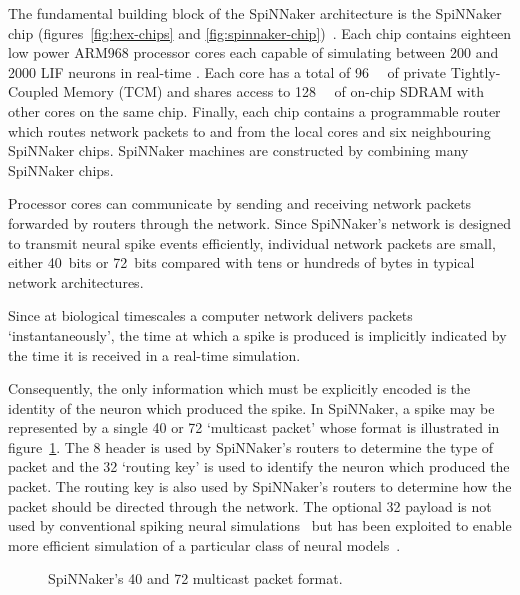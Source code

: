 		The fundamental building block of the SpiNNaker architecture is the
		SpiNNaker chip (figures~\ref{fig:hex-chips} and
		\ref{fig:spinnaker-chip})~\cite{furber13}. Each chip contains eighteen low
		power ARM968 processor cores each capable of simulating between \num{200}
		and \num{2000} LIF neurons in real-time \cite{mundy15}.  Each core has a
		total of \SI{96}{\kilo\byte} of private Tightly-Coupled Memory (TCM) and
		shares access to \SI{128}{\mega\byte} of on-chip SDRAM with other cores on
		the same chip. Finally, each chip contains a programmable router which
		routes network packets to and from the local cores and six neighbouring
		SpiNNaker chips. SpiNNaker machines are constructed by combining many
		SpiNNaker chips.
		
		Processor cores can communicate by sending and receiving network packets
		forwarded by routers through the network. Since SpiNNaker's network is
		designed to transmit neural spike events efficiently, individual network
		packets are small, either 40~bits or 72~bits compared with tens or hundreds
		of bytes in typical network architectures.
		
		Since at biological timescales a computer network delivers packets
		`instantaneously', the time at which a spike is produced is implicitly
		indicated by the time it is received in a real-time simulation.
		
		Consequently, the only information which must be explicitly encoded is the
		identity of the neuron which produced the spike. In SpiNNaker, a spike may
		be represented by a single 40 or \SI{72}{\bit} `multicast packet' whose
		format is illustrated in figure~\ref{fig:spinnaker-packet}.  The
		\SI{8}{\bit} header is used by SpiNNaker's routers to determine the type of
		packet and the \SI{32}{\bit} `routing key' is used to identify the neuron
		which produced the packet. The routing key is also used by SpiNNaker's
		routers to determine how the packet should be directed through the network.
		The optional \SI{32}{\bit} payload is not used by conventional spiking
		neural simulations~\cite{galluppi10} but has been exploited to enable more
		efficient simulation of a particular class of neural models~\cite{mundy15}.
		
		\begin{figure}
			\center
			
			\caption{SpiNNaker's \SI{40}{\bit} and \SI{72}{\bit} multicast packet
			format.}
			\label{fig:spinnaker-packet}
		\end{figure}
	
